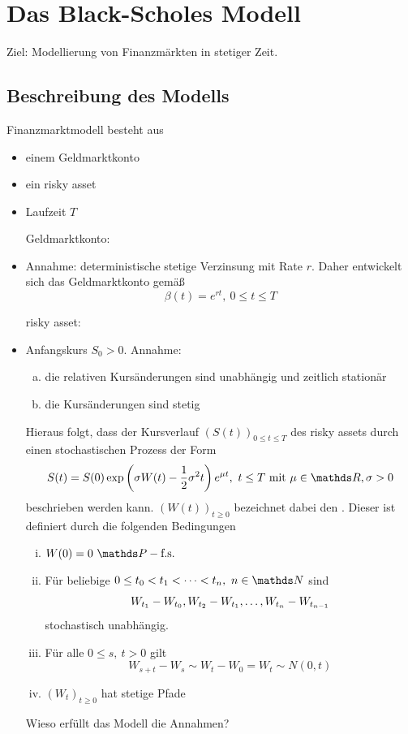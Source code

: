 \section{Das Black-Scholes Modell}
\label{sec:black_scholes_modell}
Ziel: Modellierung von Finanzmärkten in stetiger Zeit.

\subsection{Beschreibung des Modells}
\label{sub:beschreibung_des_modells}
Finanzmarktmodell besteht aus
\begin{itemize}
	\item einem Geldmarktkonto
	\item ein risky asset
	\item Laufzeit $T$
	\item[Geldmarktkonto:]
	\item Annahme: deterministische stetige Verzinsung mit Rate $r$.
	Daher entwickelt sich das Geldmarktkonto gemäß
	\[
	\beta(t)=e^{rt},~0\le t\le T
	\]
	\item[risky asset:]
	\item Anfangskurs $S_0>0$. Annahme:
	\begin{enumerate}[(a)]
		\item die relativen Kursänderungen sind unabhängig und zeitlich stationär
		\item die Kursänderungen sind stetig
	\end{enumerate} 
	Hieraus folgt, dass der Kursverlauf $(S(t))_{0\le t\le T}$ des risky assets durch einen stochastischen Prozess der Form
	\[
	S(t)=S(0)\exp\enbrace{\sigma W(t)-\frac{1}{2}\sigma^2t}e^{\mu t},~t\le T\text{ mit } \mu\in \R,\sigma>0
	\]
	beschrieben werden kann. $(W(t))_{t\ge 0}$ bezeichnet dabei den . Dieser ist definiert durch die folgenden Bedingungen
	\begin{enumerate}[(i)]
		\item $W(0)=0~\pfs$
		\item Für beliebige $0\le t_0<t_1\dt{<}t_n,~n\in \N$ sind 
		\[
		W_{t_1}-W_{t_0},W_{t_2}-W_{t_1}, \dots ,W_{t_n}-W_{t_{n-1}}
		\]
		stochastisch unabhängig.
		\item Für alle $0\le s,~t>0$ gilt
		\[
		W_{s+t}-W_s\sim W_t-W_0=W_t\sim N(0,t)
		\]
		\item $(W_t)_{t\ge0}$ hat stetige Pfade
	\end{enumerate}
	Wieso erfüllt das Modell die Annahmen?\\

\end{itemize}
